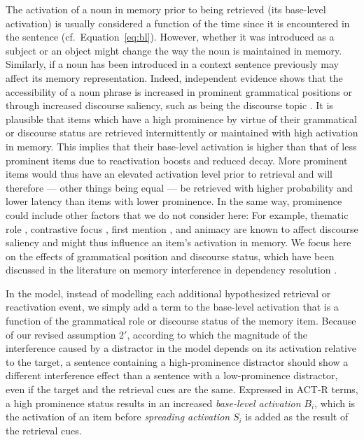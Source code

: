 \documentclass{cambridge7A}\usepackage[]{graphicx}\usepackage[]{color}
\begin{document}
The activation of a noun in memory prior to being retrieved (its base-level activation) is usually considered a function of the time since it is encountered in the sentence (cf.\ Equation~\ref{eq:bl}). 
However, whether it was introduced as a subject or an object might change the way the noun is maintained in memory. Similarly, if a noun has been introduced in a context sentence previously may affect its memory representation. Indeed, independent evidence shows that the  accessibility of a noun phrase is increased in prominent grammatical positions or through increased  discourse saliency, such as being the 
 discourse topic  \citep{Ariel1990,Arnold2007,  Brennan1995, Chafe1976, DuBois2003, GroszJoshiWeinstein1995,KeenanComrie1977}. It is plausible that items which have a high prominence by virtue of their grammatical or discourse status are retrieved intermittently or maintained with high activation in memory. This implies that their base-level activation is higher than that of less prominent items due to reactivation boosts and reduced decay.
More prominent items would thus have an elevated activation level prior to retrieval and will therefore --- other things being equal --- be retrieved with higher probability and lower latency than items with lower prominence.
In the same way, prominence could include other factors that we do not consider here: For example, thematic role \citep{Arnold2001}, contrastive focus \citep{CowlesWalenskiKluender2007}, first mention \citep{GernsbacherHargreaves1988}, and animacy \citep{FukumuraVanGompel2011} are known to affect discourse saliency and might thus influence an item's activation in memory.  
We focus here on the effects of grammatical position and  discourse status, which have been discussed in the literature on memory interference in dependency resolution \citep{VanDykeMcElree2011,CunningsFelser2013,PatilVasishthLewis2016,Sturt2003}.

In the model, instead of modelling each additional hypothesized retrieval or reactivation event, we simply add a term to the base-level activation that is a function of the grammatical role or discourse status of the memory item. Because of our revised assumption 2$'$, according to which the magnitude of the interference caused by a distractor in the model depends on its activation relative to the target, a sentence containing a high-prominence distractor should show a different interference effect than a sentence with a low-prominence distractor, even if the target and the retrieval cues are the same.
Expressed in ACT-R terms, a high prominence status results in an increased \emph{base-level activation} $B_{i}$, which is the activation of an item before \emph{spreading activation} $S_{i}$ is added as the result of the retrieval cues.\label{prominenceimplementationpageref}
\end{document}
